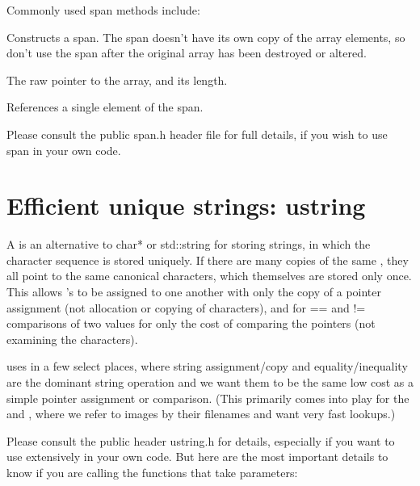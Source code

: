 \noindent Commonly used {\cf span} methods include:

Constructs a {\cf span}.  The {\cf span} doesn't have its own copy of the
array elements, so don't use the {\cf span} after the original array has been
destroyed or altered.
\apiend

The raw pointer to the array, and its length.
\apiend

References a single element of the {\cf span}.
\apiend

\smallskip
\noindent Please consult the public {\cf span.h}
header file for full details, if you wish to use {\cf span} in your own
code.


\section{Efficient unique strings: {\cf ustring}}
\label{sec:ustring}

A \ustring is an alternative to {\cf char*} or {\cf std::string} for storing
strings, in which the character sequence is stored uniquely.  If there are
many copies of the same \ustring, they all point to the same canonical
characters, which themselves are stored only once. This allows \ustring's to
be assigned to one another with only the copy of a pointer assignment (not
allocation or copying of characters), and for {\cf ==} and {\cf !=}
comparisons of two \ustring values for only the cost of comparing the
pointers (not examining the characters).

\OpenImageIO uses \ustring in a few select places, where string
assignment/copy and equality/inequality are the dominant string operation
and we want them to be the same low cost as a simple pointer assignment or
comparison.  (This primarily comes into play for the \ImageCache and
\TextureSystem, where we refer to images by their filenames and want
very fast lookups.)

Please consult the public header {\cf ustring.h} for details, especially if
you want to use \ustring extensively in your own code. But here are the most
important details to know if you are calling the \OpenImageIO functions that
take \ustring parameters:

